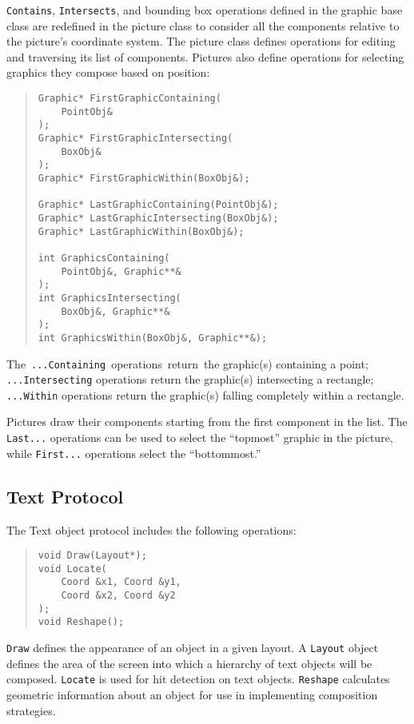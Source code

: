 {\tt Contains}, {\tt Intersects}, and bounding box operations defined
in the graphic base class are redefined in the picture class to
consider all the components relative to the picture's coordinate
system.  The picture class defines operations for editing and
traversing its list of components.  Pictures also define operations
for selecting graphics they compose based on position:
\begin{quote}
\small
\begin{verbatim}
Graphic* FirstGraphicContaining(
    PointObj&
);
Graphic* FirstGraphicIntersecting(
    BoxObj&
);
Graphic* FirstGraphicWithin(BoxObj&);

Graphic* LastGraphicContaining(PointObj&);
Graphic* LastGraphicIntersecting(BoxObj&);
Graphic* LastGraphicWithin(BoxObj&);

int GraphicsContaining(
    PointObj&, Graphic**&
);
int GraphicsIntersecting(
    BoxObj&, Graphic**&
);
int GraphicsWithin(BoxObj&, Graphic**&);
\end{verbatim}
\end{quote}
The~\mbox{{\tt ...Containing}}~\mbox{operations}~\mbox{return}~the graphic(s)
containing a point; 
{\tt ...Intersecting} operations return the graphic(s) intersecting a
rectangle; {\tt ...Within} operations return the graphic(s) falling
completely within a rectangle.

Pictures draw their components starting from the first component in
the list.  The {\tt Last...} operations can be used to select the 
``topmost'' graphic in the picture, while {\tt First...} operations select the
``bottommost.''

\subsection*{Text Protocol}

The Text object protocol includes the following operations:
\begin{quote}
\small
\begin{verbatim}
void Draw(Layout*);
void Locate(
    Coord &x1, Coord &y1, 
    Coord &x2, Coord &y2
);
void Reshape();
\end{verbatim}
\end{quote}

{\tt Draw} defines the appearance of an object in a given layout.
A {\tt Layout} object defines the area of the screen into which a
hierarchy of text objects will be composed. {\tt Locate} is used for
hit detection on text objects.  {\tt Reshape} calculates
geometric information about an object for use in implementing
composition strategies.

